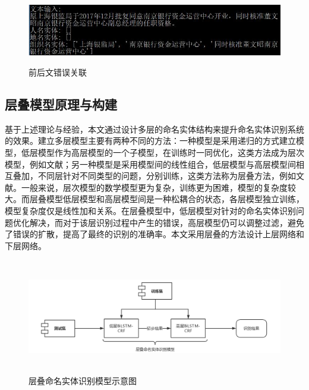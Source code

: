 \documentclass[winfonts,master,oneside,nobackinfo]{njuthesis}
\begin{document}
\begin{figure}[H]
\centering
\begin{minipage}[t]{\textwidth}
\includegraphics[width=1\textwidth,height=3cm]{./figure/前后文错误关联.jpg}
\caption{前后文错误关联}
\label{lab:1}
\end{minipage}
\end{figure}

\subsection{层叠模型原理与构建}

基于上述理论与经验，本文通过设计多层的命名实体结构来提升命名实体识别系统的效果。建立多层模型主要有两种不同的方法：一种模型是采用递归的方式建立模型，低层模型作为高层模型的一个子模型，在训练时一同优化，这类方法成为层次模型，例如文献\cite{taobao}；另一种模型是采用模型间的线性组合，低层模型与高层模型间相互叠加，不同层针对不同类型的问题，分别训练，这类方法称为层叠方法，例如文献\cite{Yixue}\cite{Jia}。一般来说，层次模型的数学模型更为复杂，训练更为困难，模型的复杂度较大。而层叠模型低层模型和高层模型间是一种松耦合的状态，各层模型独立训练，模型复杂度仅是线性加和关系。在层叠模型中，低层模型对针对的命名实体识别问题优化解决，而对于该层识别过程中产生的错误，高层模型仍可以调整过滤，避免了错误的扩散，提高了最终的识别的准确率。本文采用层叠的方法设计上层网络和下层网络。

\begin{figure}[H]
\centering
\begin{minipage}[t]{\textwidth}
\includegraphics[width=1\textwidth,height=5cm]{./figure/层叠模型.jpg}
\caption{层叠命名实体识别模型示意图}
\label{lab:1}
\end{minipage}
\end{figure}
\end{document}
